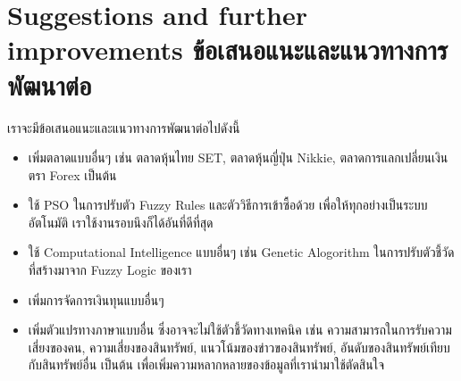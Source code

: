 \section{\ifenglish%
Suggestions and further improvements
\else%
ข้อเสนอแนะและแนวทางการพัฒนาต่อ
\fi
}
เราจะมีข้อเสนอแนะและแนวทางการพัฒนาต่อไปดังนี้
\begin{itemize}
    \item เพิ่มตลาดแบบอื่นๆ เช่น ตลาดหุ้นไทย SET, ตลาดหุ้นญี่ปุ่น Nikkie, ตลาดการแลกเปลี่ยนเงินตรา Forex เป็นต้น
    \item ใช้ PSO ในการปรับตัว Fuzzy Rules และตัววิธีการเข้าซื้อด้วย เพื่อให้ทุกอย่างเป็นระบบอัตโนมัติ เราใช้งานรอบนึงก็ได้อันที่ดีที่สุด
    \item ใช้ Computational Intelligence แบบอื่นๆ เช่น Genetic Alogorithm ในการปรับตัวชี้วัดที่สร้างมาจาก Fuzzy Logic ของเรา
    \item เพิ่มการจัดการเงินทุนแบบอื่นๆ  
    \item เพิ่มตัวแปรทางภาษาแบบอื่น ซึ่งอาจจะไม่ใช้ตัวชี้วัดทางเทคนิค เช่น ความสามารถในการรับความเสี่ยงของคน, ความเสี่ยงของสินทรัพย์, แนวโน้มของข่าวของสินทรัพย์, อันดับของสินทรัพย์เทียบกับสินทรัพย์อื่น เป็นต้น เพื่อเพิ่มความหลากหลายของข้อมูลที่เรานำมาใช้ตัดสินใจ
\end{itemize}